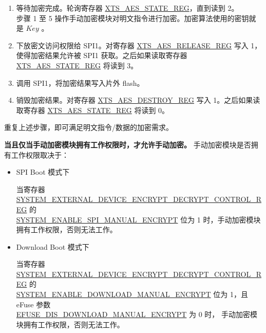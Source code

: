 \documentclass[main\_\_CN.tex]{subfiles}
\begin{document}
\begin{enumerate}
    \item \label{Wait for calculation done in xts}
        等待加密完成。轮询寄存器 \hyperref[regdesc:XTSAESSTATEREG]{XTS\_AES\_STATE\_REG}，直到读到 2。\\
    步骤 1 至 5 操作手动加密模块对明文指令进行加密。加密算法使用的密钥就是  \begin{math}Key\end{math} 。

    \item \label{release access permission}
        下放密文访问权限给 SPI1。对寄存器 \hyperref[regdesc:XTSAESRELEASEREG]{XTS\_AES\_RELEASE\_REG} 写入 1，使得加密结果允许被 SPI1 获取。之后如果读取寄存器 \hyperref[regdesc:XTSAESSTATEREG]{XTS\_AES\_STATE\_REG} 将读到 3。

    \item \label{invoke spi and wait until done}
        调用 SPI1，将加密结果写入片外 flash。

    \item \label{destroy ciphertext result and return to idle}
        销毁加密结果。对寄存器 \hyperref[regdesc:XTSAESDESTROYREG]{XTS\_AES\_DESTROY\_REG} 写入 1。之后如果读取寄存器 \hyperref[regdesc:XTSAESSTATEREG]{XTS\_AES\_STATE\_REG} 将读到 0。

\end{enumerate}

重复上述步骤，即可满足明文指令/数据的加密需求。


\textbf{ 当且仅当手动加密模块拥有工作权限时，才允许手动加密。}  手动加密模块是否拥有工作权限取决于：

\begin{itemize}

    \item SPI Boot 模式下

    当寄存器 \hyperref[regdesc:SYSTEMEXTERNALDEVICEENCRYPTDECRYPTCONTROLREG]{SYSTEM\_EXTERNAL\_DEVICE\_ENCRYPT\_DECRYPT\_CONTROL\_REG} 的 \\ \hyperref[fielddesc:SYSTEMENABLESPIMANUALENCRYPT]{SYSTEM\_ENABLE\_SPI\_MANUAL\_ENCRYPT} 位为 1 时，手动加密模块拥有工作权限，否则无法工作。

    \item Download Boot 模式下

    当寄存器 \hyperref[regdesc:SYSTEMEXTERNALDEVICEENCRYPTDECRYPTCONTROLREG]{SYSTEM\_EXTERNAL\_DEVICE\_ENCRYPT\_DECRYPT\_CONTROL\_REG} 的\\ \hyperref[fielddesc:SYSTEMENABLEDOWNLOADMANUALENCRYPT]{SYSTEM\_ENABLE\_DOWNLOAD\_MANUAL\_ENCRYPT} 位为 1，且 eFuse 参数\\ \hyperref[fielddesc:EFUSEDISDOWNLOADMANUALENCRYPT]{EFUSE\_DIS\_DOWNLOAD\_MANUAL\_ENCRYPT} 为 0 时，
    手动加密模块拥有工作权限，否则无法工作。

\end{itemize}
\end{document}
